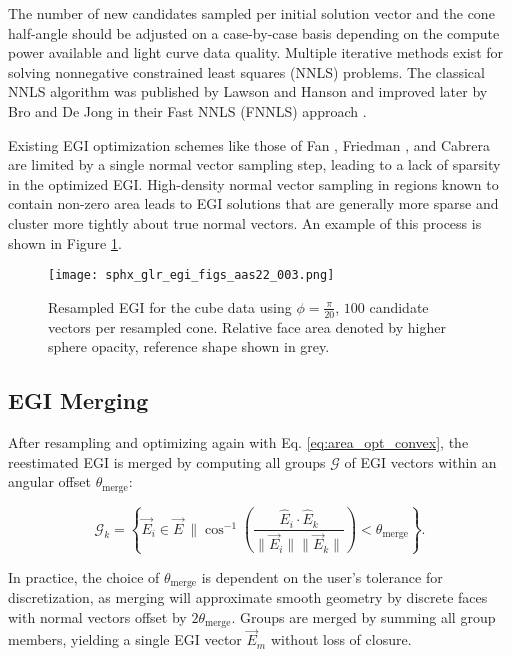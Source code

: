 The number of new candidates sampled per initial solution vector and the cone half-angle should be adjusted on a case-by-case basis depending on the compute power available and light curve data quality. Multiple iterative methods exist for solving nonnegative constrained least squares (NNLS) problems. The classical NNLS algorithm was published by Lawson and Hanson and improved later by Bro and De Jong in their Fast NNLS (FNNLS) approach \cite{lawson1976, bro1996}.

Existing EGI optimization schemes like those of Fan \cite{fan2020thesis}, Friedman \cite{friedman2020}, and Cabrera \cite{cabrera2021} are limited by a single normal vector sampling step, leading to a lack of sparsity in the optimized EGI. High-density normal vector sampling in regions known to contain non-zero area leads to EGI solutions that are generally more sparse and cluster more tightly about true normal vectors. An example of this process is shown in Figure \ref{fig:resampled_egi}.

\begin{figure}[!htb]
  \centering
  \texttt{[image: sphx\_glr\_egi\_figs\_aas22\_003.png]}
  \caption{Resampled EGI for the cube data using $\phi = \frac{\pi}{20}$, $100$ candidate vectors per resampled cone. Relative face area denoted by higher sphere opacity, reference shape shown in grey.}
  \label{fig:resampled_egi}
\end{figure}

\subsection{EGI Merging}

After resampling and optimizing again with Eq. \ref{eq:area_opt_convex}, the reestimated EGI is merged by computing all groups $\mathcal{G}$ of EGI vectors within an angular offset $\theta_\mathrm{merge}$:

\begin{equation} \label{eq:egi_merge}
  \mathcal{G}_k = \left\{ \vec{E}_i \in \vec{E} \:\| \cos^{-1}\left( \frac{\hat{E}_i \cdot \hat{E}_k}{\|\vec{E}_i \| \| \vec{E}_k \|}\right) < \theta_\mathrm{merge} \right\}.
\end{equation}

In practice, the choice of $\theta_\mathrm{merge}$ is dependent on the user's tolerance for discretization, as merging will approximate smooth geometry by discrete faces with normal vectors offset by $2\theta_\mathrm{merge}$. Groups are merged by summing all group members, yielding a single EGI vector $\vec{E}_m$ without loss of closure. 

